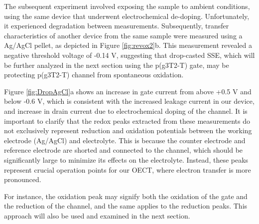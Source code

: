 The subsequent experiment involved exposing the sample to ambient conditions, using the same device that underwent electrochemical de-doping. Unfortunately, it experienced degradation between measurements. Subsequently, transfer characteristics of another device from the same sample were measured using a Ag/AgCl pellet, as depicted in Figure \ref{fig:revox2}b. This measurement revealed a negative threshold voltage of -0.14 V, suggesting that drop-casted SSE, which will be further analyzed in the next section using the p(g3T2-T) gate, may be protecting p(g3T2-T) channel from spontaneous oxidation.

Figure \ref{fig:DropAgCl}a shows an increase in gate current from above +0.5 V and below -0.6 V, which is consistent with the increased leakage current in our device, and increase in drain current due to electrochemical doping of the channel. It is important to clarify that the redox peaks extracted from these measurements do not exclusively represent reduction and oxidation potentials between the working electrode (Ag/AgCl) and electrolyte. This is because the counter electrode and reference electrode are shorted and connected to the channel, which should be significantly large to minimize its effects on the electrolyte. Instead, these peaks represent crucial operation points for our OECT, where electron transfer is more pronounced. 

For instance, the oxidation peak may signify both the oxidation of the gate and the reduction of the channel, and the same applies to the reduction peaks. This approach will also be used and examined in the next section.

